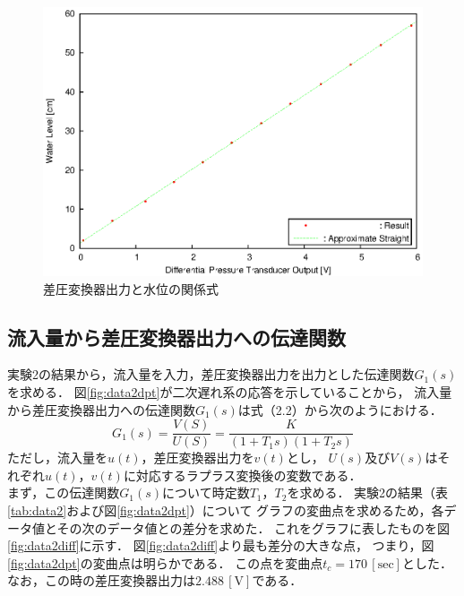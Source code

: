 \documentclass[11pt,a4paper]{jsarticle}
\begin{document}
    \begin{figure}[h]
      \begin{center}
        \includegraphics[width=0.9\hsize]{./fig/least_square.eps}
      \end{center}
      \caption{差圧変換器出力と水位の関係式}
      \label{fig:least_square}
    \end{figure}

  \subsection{流入量から差圧変換器出力への伝達関数}
    実験2の結果から，流入量を入力，差圧変換器出力を出力とした伝達関数$G_1(s)$を求める．
    図\ref{fig:data2dpt}が二次遅れ系の応答を示していることから，
    流入量から差圧変換器出力への伝達関数$G_1(s)$は式（2.2）から次のようにおける．
    \begin{equation}
      G_1(s) = \frac{V(S)}{U(S)} = \frac{K}{(1 + T_1 s)(1 + T_2 s)}
    \end{equation}
    ただし，流入量を$u(t)$，差圧変換器出力を$v(t)$とし，
    $U(s)$及び$V(s)$はそれぞれ$u(t)$，$v(t)$に対応するラプラス変換後の変数である．\\

    まず，この伝達関数$G_1(s)$について時定数$T_1$，$T_2$を求める．
    実験2の結果（表\ref{tab:data2}および図\ref{fig:data2dpt}）について
    グラフの変曲点を求めるため，各データ値とその次のデータ値との差分を求めた．
    これをグラフに表したものを図\ref{fig:data2diff}に示す．
    図\ref{fig:data2diff}より最も差分の大きな点，
    つまり，図\ref{fig:data2dpt}の変曲点は明らかである．
    この点を変曲点$t_c = 170\,\mathrm{[sec]}$とした．
    なお，この時の差圧変換器出力は$2.488\,\mathrm{[V]}$である．\\
\end{document}
